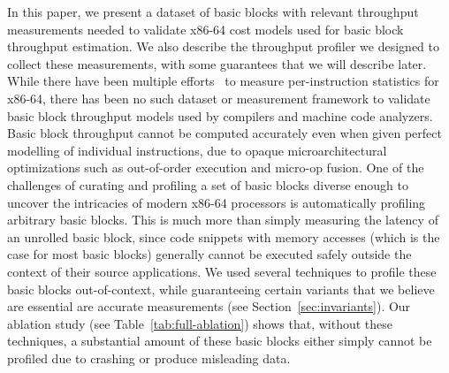 In this paper, we present a dataset
of basic blocks with relevant throughput measurements needed to validate x86-64 cost models used for
basic block throughput estimation. 
We also describe the throughput profiler we designed to collect these measurements,
with some guarantees that we will describe later.
While there have been multiple efforts~\cite{agner,uops,exegesis} to measure per-instruction
statistics for x86-64,
there has been no such dataset or measurement framework to validate basic block throughput models used by
compilers and machine code analyzers.
Basic block throughput cannot be computed accurately even when given perfect modelling of individual instructions,
due to opaque microarchitectural optimizations such as out-of-order execution and micro-op fusion.
One of the challenges of curating and profiling a set of basic blocks diverse enough to
uncover the intricacies of modern x86-64 processors is automatically profiling arbitrary
basic blocks.
This is much more than simply measuring the latency of an unrolled basic block,
since code snippets with memory accesses (which is the case for most basic blocks)
generally cannot be executed safely
outside the context of their source applications.
We used several techniques to profile these basic blocks out-of-context,
while guaranteeing certain variants that we believe are essential are accurate measurements (see Section~\ref{sec:invariants}).
Our ablation study (see Table~\ref{tab:full-ablation}) shows that, without these techniques,
a substantial amount of these basic blocks either simply cannot be profiled due to crashing
or produce misleading data.

